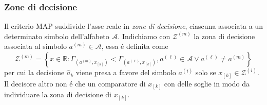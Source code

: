         \subsubsection{Zone di decisione}
            Il criterio MAP suddivide l'asse reale in \emph{zone di decisione}, ciascuna associata a un determinato simbolo dell'alfabeto $\mathcal{A}$.
            Indichiamo con $\mathcal{Z}^{(m)}$ la zona di decisione associata al simbolo $a^{(m)}\in\mathcal{A}$, essa é definita come
            \[
                \mathcal{Z}^{(m)} = \left\{ x\in\mathbb{R}: \Gamma_{(a^{(m)},x_{[k]})}<\Gamma_{(a^{(\ell)},x_{[k]})}, a^{(\ell)}\in\mathcal{A} \vee a^{(\ell)}\neq a^{(m)} \right\}
            \]   
            per cui la decisione $\hat{a}_{k}$ viene presa a favore del simbolo $a^{(i)}$ solo se $x_{[k]}\in \mathcal{Z}^{(i)}$. Il decisore altro non é 
            che un comparatore di $x_{[k]}$ con delle soglie in modo da individuare la zona di decisione di $x_{[k]}$. 

